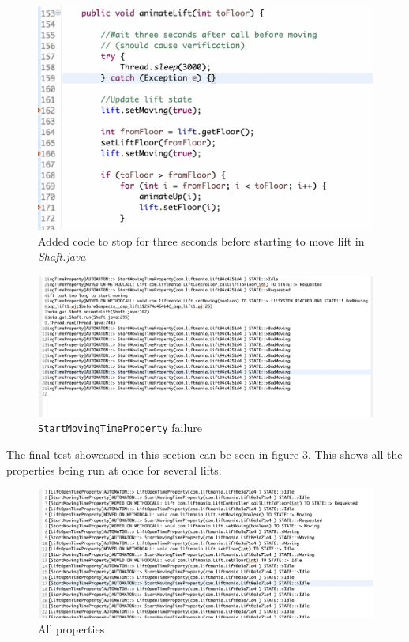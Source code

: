 \documentclass[a4paper, 12pt]{article}
\begin{document}
\begin{figure}
   \centering
   \includegraphics[width=\textwidth,height=\textheight,keepaspectratio]{images/start-moving-time-property-failure-edit} %
   \caption{Added code to stop for three seconds before starting to move lift in \textit{Shaft.java}}
   \label{fig:start-moving-time-property-failure-edit}
\end{figure}

\begin{figure}
   \centering
   \includegraphics[width=\textwidth,height=\textheight,keepaspectratio]{images/start-moving-time-property-failed} %
   \caption{\texttt{StartMovingTimeProperty} failure}
   \label{fig:start-moving-time-property-failed}
\end{figure}

The final test showcased in this section can be seen in figure \ref{fig:all-properties}. This shows all the properties being run at once for several lifts. 

\begin{figure}
   \centering
   \includegraphics[width=\textwidth,height=\textheight,keepaspectratio]{images/all-properties} %
   \caption{All properties}
   \label{fig:all-properties}
\end{figure}
\end{document}
